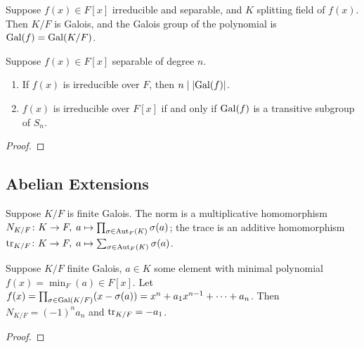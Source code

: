 
\begin{definition}
    Suppose \(f(x) \in F[x]\) irreducible and separable,
    and \(K\) splitting field of \(f(x)\).
    Then \(K/F\) is Galois,
    and the Galois group of the polynomial is \(\operatorname{Gal}(f) = \operatorname{Gal}(K/F)\).
\end{definition}
\begin{theorem}
    Suppose \(f(x) \in F[x]\) separable of degree \(n\).
    \begin{enumerate}[label={(\alph*)}, itemsep=0mm]
        \item If \(f(x)\) is irreducible over \(F\),
            then \(n \mid \abs{\operatorname{Gal}(f)}\).
        \item \(f(x)\) is irreducible over \(F[x]\)
            if and only if \(\operatorname{Gal}(f)\) is a transitive subgroup of \(S_n\).
    \end{enumerate}
\end{theorem}
\begin{proof}
\end{proof}


\subsection{Abelian Extensions}

\begin{definition}
    Suppose \(K/F\) is finite Galois.
    The norm is a multiplicative homomorphism
    \(N_{K/F}\colon K\to F,\;a\mapsto\prod_{\sigma\in\operatorname{Aut}_F(K)} \sigma(a)\);
    the trace is an additive homomorphism
    \(\tr_{K/F}\colon K\to F,\;a\mapsto\sum_{\sigma\in\operatorname{Aut}_F(K)} \sigma(a)\).
\end{definition}
\begin{proposition}
    Suppose \(K/F\) finite Galois,
    \(a \in K\) some element with minimal polynomial \(f(x) = \min_F(a) \in F[x]\).
    Let \(f(x) = \prod_{\sigma\in\operatorname{Gal}(K/F)} (x-\sigma(a)) = x^n + a_1 x^{n-1} + \cdots + a_n\).
    Then \(N_{K/F} = {(-1)}^n a_n\)  and \(\tr_{K/F} = -a_1\).
\end{proposition}
\begin{proof}
\end{proof}

